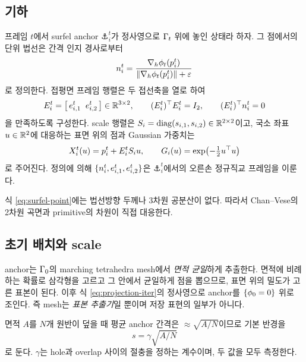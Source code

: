 \subsection{기하}

프레임 $t$에서 surfel anchor $\anchor^t_i$가 정사영으로 $\Gamma_t$ 위에 놓인 상태라
하자. 그 점에서의 단위 법선은 간격 인지 경사로부터
\begin{equation}
  n^t_i = \frac{\nabla_h\phi_t(p^t_i)}{\left\lVert \nabla_h\phi_t(p^t_i) \right\rVert+\varepsilon}
  \label{eq:unit-normal}
\end{equation}
로 정의한다. 접평면 프레임 행렬은 두 접선축을 열로 하여
\begin{equation}
  E^t_i = \bigl[\,e^t_{i,1}\;\; e^t_{i,2}\,\bigr] \in \mathbb{R}^{3\times2},
  \qquad (E^t_i)^{\top} E^t_i = I_2,
  \qquad (E^t_i)^{\top} n^t_i = 0
  \label{eq:frame}
\end{equation}
을 만족하도록 구성한다. scale 행렬은
$S_i = \operatorname{diag}(s_{i,1},s_{i,2}) \in \mathbb{R}^{2\times2}$이고, 국소
좌표 $u\in\mathbb{R}^2$에 대응하는 표면 위의 점과 Gaussian 가중치는
\begin{equation}
  X^t_i(u) = p^t_i + E^t_i S_i u,
  \qquad
  G_i(u) = \exp\!\left(-\tfrac{1}{2}u^{\top} u\right)
  \label{eq:surfel-point}
\end{equation}
로 주어진다. 정의에 의해 $\{n^t_i, e^t_{i,1}, e^t_{i,2}\}$은 $\anchor^t_i$에서의
오른손 정규직교 프레임을 이룬다.

식 \eqref{eq:surfel-point}에는 법선방향 두께나 3차원 공분산이 없다. 따라서
Chan--Vese의 2차원 곡면과 primitive의 차원이 직접 대응한다.

\subsection{초기 배치와 scale}

anchor는 $\Gamma_0$의 marching tetrahedra mesh에서 \emph{면적 균일}하게 추출한다.
면적에 비례하는 확률로 삼각형을 고르고 그 안에서 균일하게 점을 뽑으므로, 표면 위의
밀도가 고른 표본이 된다. 이후 식 \eqref{eq:projection-iter}의 정사영으로 anchor를
$\{\phi_0=0\}$ 위로 조인다. 즉 mesh는 \emph{표본 추출기}일 뿐이며 저장 표현의
일부가 아니다.

면적 $A$를 $N$개 원반이 덮을 때 평균 anchor 간격은 $\approx\sqrt{A/N}$이므로 기본
반경을
\begin{equation}
  s = \gamma\sqrt{A/N}
  \label{eq:scale-init}
\end{equation}
로 둔다. $\gamma$는 hole과 overlap 사이의 절충을 정하는 계수이며, 두 값을 모두
측정한다.

